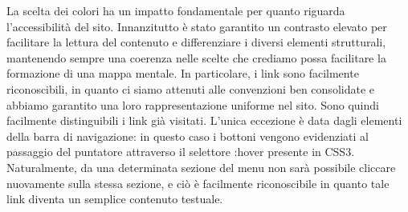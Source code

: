 La scelta dei colori ha un impatto fondamentale per quanto riguarda l'accessibilità del sito. Innanzitutto è stato garantito un contrasto elevato per facilitare la lettura del contenuto e differenziare i diversi elementi strutturali, mantenendo sempre una coerenza nelle scelte che crediamo possa facilitare la formazione di una mappa mentale. In particolare, i link sono facilmente riconoscibili, in quanto ci siamo attenuti alle convenzioni ben consolidate e abbiamo garantito una loro rappresentazione uniforme nel sito. Sono quindi facilmente distinguibili i link già visitati.
L'unica eccezione è data dagli elementi della barra di navigazione: in questo caso i bottoni vengono evidenziati al passaggio del puntatore attraverso il selettore :hover presente in CSS3. Naturalmente, da una determinata sezione del menu non sarà possibile cliccare nuovamente sulla stessa sezione, e ciò è facilmente riconoscibile in quanto tale link diventa un semplice contenuto testuale.